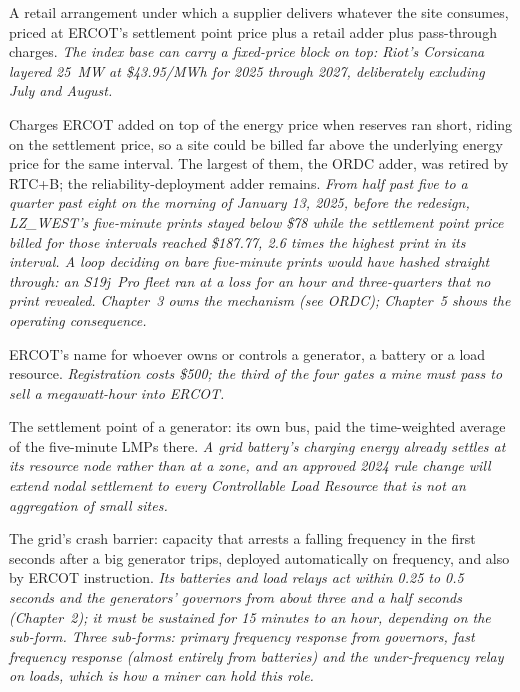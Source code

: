 \begin{description}[leftmargin=0pt,style=unboxed,itemsep=0.35em,parsep=0.15em]
\item[requirements contract] \hypertarget{glossary:requirements-contract}{}A retail arrangement under which a supplier delivers whatever the site consumes, priced at ERCOT's settlement point price plus a retail adder plus pass-through charges. \emph{The index base can carry a fixed-price block on top: Riot's Corsicana layered 25~MW at \$43.95/MWh for 2025 through 2027, deliberately excluding July and August.}
\item[reserve-scarcity adder] \hypertarget{glossary:reserve-scarcity-adder}{}Charges ERCOT added on top of the energy price when reserves ran short, riding on the settlement price, so a site could be billed far above the underlying energy price for the same interval. The largest of them, the ORDC adder, was retired by RTC+B; the reliability-deployment adder remains. \emph{From half past five to a quarter past eight on the morning of January 13, 2025, before the redesign, LZ\_WEST's five-minute prints stayed below \$78 while the settlement point price billed for those intervals reached \$187.77, 2.6 times the highest print in its interval. A loop deciding on bare five-minute prints would have hashed straight through: an S19j~Pro fleet ran at a loss for an hour and three-quarters that no print revealed. Chapter~3 owns the mechanism (see ORDC); Chapter~5 shows the operating consequence.}
\item[resource entity] \hypertarget{glossary:resource-entity}{}ERCOT's name for whoever owns or controls a generator, a battery or a load resource. \emph{Registration costs \$500; the third of the four gates a mine must pass to sell a megawatt-hour into ERCOT.}
\item[resource node] \hypertarget{glossary:resource-node}{}The settlement point of a generator: its own bus, paid the time-weighted average of the five-minute LMPs there. \emph{A grid battery's charging energy already settles at its resource node rather than at a zone, and an approved 2024 rule change will extend nodal settlement to every Controllable Load Resource that is not an aggregation of small sites.}
\item[Responsive Reserve Service (RRS)] \hypertarget{glossary:responsive-reserve-service}{}The grid's crash barrier: capacity that arrests a falling frequency in the first seconds after a big generator trips, deployed automatically on frequency, and also by ERCOT instruction. \emph{Its batteries and load relays act within 0.25 to 0.5 seconds and the generators' governors from about three and a half seconds (Chapter~2); it must be sustained for 15 minutes to an hour, depending on the sub-form. Three sub-forms: primary frequency response from governors, fast frequency response (almost entirely from batteries) and the under-frequency relay on loads, which is how a miner can hold this role.}

\end{description}
